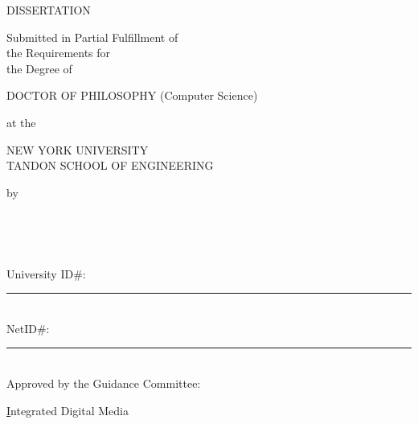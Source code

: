 %
\setcounter{page}{1}
\thispagestyle{empty}
%
\begin{center}
{\bfseries 
  {\large\thesistitle}
  \vspace{.25in}
  
  DISSERTATION\\
  \vspace{.25in}
  
  \begin{doublespace}
  Submitted in Partial Fulfillment of\\
  the Requirements for\\
  the Degree of\\
  \end{doublespace}
  \vspace{.25in}
  
  DOCTOR OF PHILOSOPHY (Computer Science)\\
  \vspace{.25in}
  
  at the \\
  \vspace{.1in}
  
  {\large
  NEW YORK UNIVERSITY\\
  \vspace{0.05in}
  TANDON SCHOOL OF ENGINEERING\\
  }
  \vspace{.2in}
  
  by
  \vspace{.3in}

  \thesisauthor
  \vspace{.3in}

  \graddate
}

\end{center}

\vspace{0.2in}

\noindent
{}
\vspace{0.1in}

\noindent
\makebox[\textwidth]{\hfill\makebox[2.5in]{\hrulefill}}\\
\vspace{0.05in}

\noindent
\makebox[\textwidth]{\hfill\makebox[2.5in]{\hrulefill}}\\

\noindent
University ID\#:\hspace{3pt} \noindent\rule[-3pt]{2in}{0.4pt}\\
\vspace{0.05in}
NetID\#:      \noindent\rule[-3pt]{2in}{0.4pt}\\

\vspace{1in}
\noindent
Approved by the Guidance Committee:
\singlespacing

\noindent
\underline Integrated Digital Media
\vspace{0.1in}